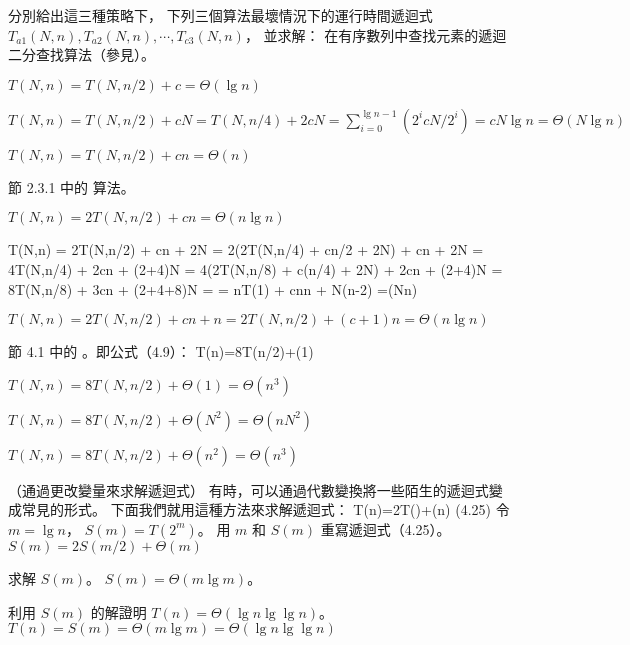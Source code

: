 分別給出這三種策略下，
下列三個算法最壞情況下的運行時間遞迴式 $T_{a1}(N,n), T_{a2}(N,n),\cdots,T_{c3}(N,n)$，
並求解：
\startigBase[a]
在有序數列中查找元素的遞迴二分查找算法（參見）。
\stopitem
\startANSWER
\startigBase[n]
\item $T(N,n) = T(N,n/2) + c = \Theta(\lg n)$
\item $T(N,n) = T(N,n/2) + cN = T(N,n/4) + 2cN = \sum_{i=0}^{\lg n - 1}(2^i cN/2^i) = cN\lg n = \Theta(N\lg n)$
\item $T(N,n) = T(N,n/2) + cn = \Theta(n)$
\stopigBase
\stopANSWER

\startitem
節 2.3.1 中的  算法。
\stopitem
\startANSWER
\startigBase[n]
\item $T(N,n) = 2T(N,n/2) + cn = \Theta(n\lg{n})$
\item
\startsplitformula\startmathalignment
\NC T(N,n) \NC= 2T(N,n/2) + cn + 2N \NR
\NC      \NC= 2(2T(N,n/4) + cn/2 + 2N) + cn + 2N \NR
\NC      \NC= 4T(N,n/4) + 2cn + (2+4)N \NR
\NC      \NC= 4(2T(N,n/8) + c(n/4) + 2N) + 2cn + (2+4)N \NR
\NC      \NC= 8T(N,n/8) + 3cn + (2+4+8)N \NR
\NC      \NC= \cdots \NR
\NC      \NC= nT(1) + cn\lg n + N(n-2) \NR
\NC      \NC=\Theta(Nn) \NR
\stopmathalignment\stopsplitformula
\item $T(N,n) = 2T(N,n/2) + cn + n = 2T(N,n/2) + (c+1)n = \Theta(n\lg{n})$
\stopigBase
\stopANSWER

\startitem
節 4.1 中的 。即公式（4.9）：
\startformula
T(n)=8T(n/2)+\Theta(1)
\stopformula
\stopitem
\startANSWER
\startigBase[n]
\item $T(N,n) = 8T(N,n/2) + \Theta(1) = \Theta(n^3)$
\item $T(N,n) = 8T(N,n/2) + \Theta(N^2) = \Theta(n N^2)$
\item $T(N,n) = 8T(N,n/2) + \Theta(n^2) = \Theta(n^3)$
\stopigBase
\stopANSWER
\stopigBase
\stopPROBLEM

\startPROBLEM（通過更改變量來求解遞迴式）
有時，可以通過代數變換將一些陌生的遞迴式變成常見的形式。
下面我們就用這種方法來求解遞迴式：
\startformula
T(n)=2T()+\Theta(\lg n)	\hfill (4.25)
\stopformula
\startigBase[a]
\startitem
令 $m=\lg n$， $S(m)=T(2^m)$。
用 $m$ 和 $S(m)$ 重寫遞迴式（4.25）。
\stopitem
\startANSWER
$S(m)=2S(m/2)+\Theta(m)$
\stopANSWER

\startitem
求解 $S(m)$。
\stopitem
\startANSWER
$S(m)=\Theta(m\lg m)$。
\stopANSWER

\startitem
利用 $S(m)$ 的解證明 $T(n)=\Theta(\lg n \lg\lg n)$。
\stopitem
\startANSWER
$T(n)=S(m)=\Theta(m\lg m)=\Theta(\lg n\lg\lg n)$
\stopANSWER

